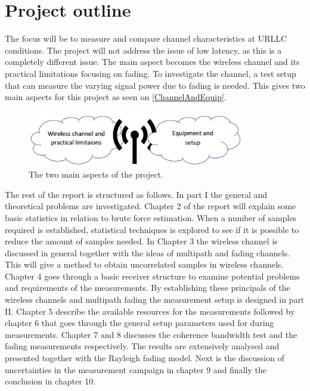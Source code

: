 \newpage
\section{Project outline}

The focus will be to measure and compare channel characteristics at URLLC conditions. The project will not address the issue of low latency, as this is a completely different issue. The main aspect becomes the wireless channel and its practical limitations focusing on fading. To investigate the channel, a test setup that can measure the varying signal power due to fading is needed. This gives two main aspects for this project as seen on \autoref{ChannelAndEquip}.

\begin{figure}[H]
\centering
\includegraphics[width=0.85\textwidth]{figures/ProOutline.png}
\caption{The two main aspects of the project.}
\label{ChannelAndEquip}
\end{figure}



The rest of the report is structured as follows. In part I the general and theoretical problems are investigated. Chapter 2 of the report will explain some basic statistics in relation to brute force estimation. When a number of samples required is established, statistical techniques is explored to see if it is possible to reduce the amount of samples needed. In Chapter 3 the wireless channel is discussed in general together with  the ideas of multipath and fading channels. This will give a method to obtain uncorrelated samples in wireless channels. Chapter 4 goes through a basic receiver structure to examine potential problems and requirements of the measurements. By establishing these principals of the wireless channels and multipath fading the measurement setup is designed in part II. Chapter 5 describe the available resources for the measurements followed by chapter 6 that goes through the general setup parameters used for during measurements. Chapter 7 and 8 discusses the coherence bandwidth test and the fading measurements respectively. The results are extensively analysed and presented together with the Rayleigh fading model. Next is the discussion of uncertainties in the measurement campaign in chapter 9 and finally the conclusion in chapter 10.

